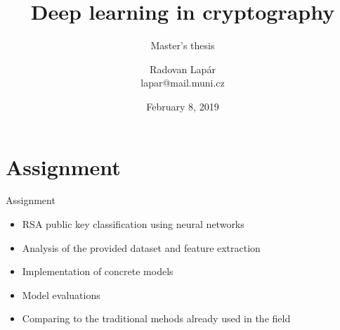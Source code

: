 \documentclass[
]{beamer}
\begin{document}
\title[Deep learning in cryptography]{Deep learning in cryptography}
\subtitle{Master's thesis}
\author[R.\,Lap\'{a}r]{Radovan Lap\'{a}r \\ lapar@mail.muni.cz}
\date{February 8, 2019}
\subject{Presentation Subject}

\begin{frame}[plain]
\maketitle
\end{frame}

\section{Assignment}

\begin{frame}{Assignment}
\begin{itemize}
  \item RSA public key classification using neural networks
  \vspace{3mm}
  \item Analysis of the provided dataset and feature extraction
  \vspace{3mm}
  \item Implementation of concrete models
  \vspace{3mm}
  \item Model evaluations
  \vspace{3mm}
  \item Comparing to the traditional mehods already used in the field
\end{itemize}
\end{frame}
\end{document}
